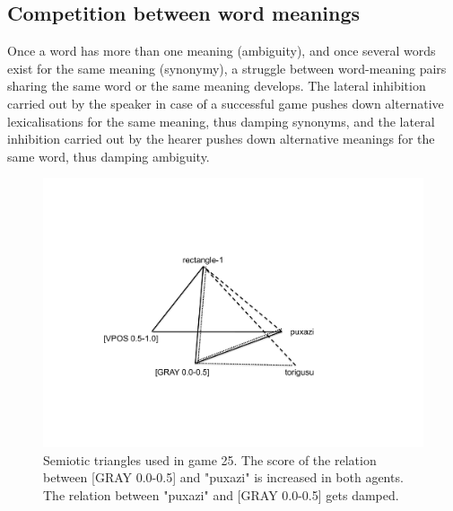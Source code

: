 \subsection{Competition between word meanings }

Once a word has more than one meaning (ambiguity), 
and once several words exist for the same meaning 
(synonymy), a struggle between word-meaning
pairs sharing the same word or the 
same meaning develops. The lateral inhibition carried out by the 
speaker in case of a successful game pushes
down alternative lexicalisations for the same meaning, 
thus damping synonyms, and the lateral inhibition carried out 
by the hearer pushes down alternative meanings for the 
same word, thus damping ambiguity. 
\begin{figure}[htbp]
  \centerline{\includegraphics[width=.60\textwidth]{chap6/figs/triangle5}}
\caption{\label{triangle5} Semiotic triangles used 
in game 25. The score of the relation between [GRAY 0.0-0.5] and 
"puxazi" is increased in both agents. The relation between "puxazi" and 
{}[GRAY 0.0-0.5] gets damped.}
\end{figure}

